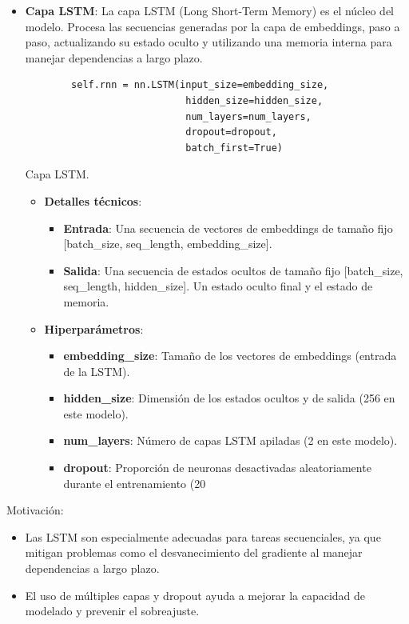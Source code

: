 \documentclass{article}
\begin{document}
\newpage

\begin{itemize}
    \item \textbf{Capa LSTM}: La capa LSTM (Long Short-Term Memory) es el núcleo del modelo. Procesa las secuencias generadas por la capa de embeddings, paso a paso, actualizando su estado oculto y utilizando una memoria interna para manejar dependencias a largo plazo.
    \begin{listing}[H]
    \begin{verbatim}
        self.rnn = nn.LSTM(input_size=embedding_size,
                            hidden_size=hidden_size,
                            num_layers=num_layers,
                            dropout=dropout,
                            batch_first=True)
    \end{verbatim}
    \caption{Capa LSTM.}
    \end{listing}
    \begin{itemize}
        \item \textbf{Detalles técnicos}:
        \begin{itemize}
            \item \textbf{Entrada}: Una secuencia de vectores de embeddings de tamaño fijo [batch\_size, seq\_length, embedding\_size].
            \item \textbf{Salida}: Una secuencia de estados ocultos de tamaño fijo [batch\_size, seq\_length, hidden\_size]. Un estado oculto final y el estado de memoria.
        \end{itemize}
        \item \textbf{Hiperparámetros}:
        \begin{itemize}
            \item \textbf{embedding\_size}: Tamaño de los vectores de embeddings (entrada de la LSTM).
            \item \textbf{hidden\_size}: Dimensión de los estados ocultos y de salida (256 en este modelo).
            \item \textbf{num\_layers}: Número de capas LSTM apiladas (2 en este modelo).
            \item \textbf{dropout}: Proporción de neuronas desactivadas aleatoriamente durante el entrenamiento (20%
        \end{itemize}
    \end{itemize}
\end{itemize}

{\large{Motivación}}:
\begin{itemize}
    \item Las LSTM son especialmente adecuadas para tareas secuenciales, ya que mitigan problemas como el desvanecimiento del gradiente al manejar dependencias a largo plazo.
    \item El uso de múltiples capas y dropout ayuda a mejorar la capacidad de modelado y prevenir el sobreajuste.
\end{itemize}
\end{document}
